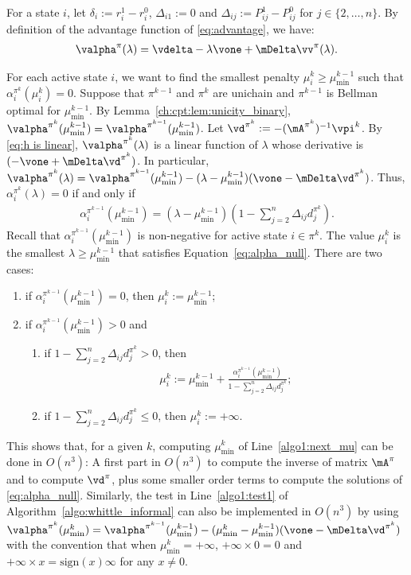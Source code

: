For a state $i$, let $\delta_i:=r^1_i - r^0_i$, $\Delta_{i1}:=0$ and $\Delta_{ij}:=P^1_{ij}-P^0_{ij}$ for $j\in\{2,\dots, n\}$. By definition of the advantage function of \eqref{eq:advantage}, we have: 
\begin{align*}
    \valpha^\pi(\lambda)=\vdelta -\lambda\vone +\mDelta\vv^\pi(\lambda).
\end{align*}

For each active state $i$, we want to find the smallest penalty $\mu^k_i\ge\mu^{k-1}_{\min}$ such that $\alpha^{\pi^k}_i(\mu^k_i)=0$.
Suppose that $\pi^{k-1}$ and $\pi^k$ are unichain and $\pi^{k-1}$ is Bellman optimal for $\mu^{k-1}_{\min}$.
By Lemma~\ref{ch:cpt:lem:unicity_binary}, $\valpha^{\pi^k}(\mu^{k-1}_{\min})= \valpha^{\pi^{k-1}}(\mu^{k-1}_{\min})$.
Let $\vd^{\pi^k}:=-(\mA^{\pi^k})^{-1}{\vpi^k}$.
By \eqref{eq:h is linear}, $\valpha^{\pi^k}(\lambda)$ is a linear function of $\lambda$ whose derivative is $(-\vone+\mDelta\vd^{\pi^k})$.
In particular, $\valpha^{\pi^k}(\lambda)=\valpha^{\pi^{k-1}}(\mu^{k-1}_{\min}) -(\lambda-\mu^{k-1}_{\min})(\vone -\mDelta\vd^{\pi^k})$.
Thus, $\alpha^{\pi^k}_i(\lambda)=0$ if and only if
\begin{align}
    \label{eq:alpha_null}
    \alpha^{\pi^{k-1}}_i(\mu^{k-1}_{\min}) = (\lambda -\mu^{k-1}_{\min})(1 -\sum_{j=2}^n\Delta_{ij} d_j^{\pi^k}).
\end{align}
Recall that $\alpha^{\pi^{k-1}}_i(\mu^{k-1}_{\min})$ is non-negative for active state $i\in\pi^k$. The value $\mu^k_i$ is the smallest $\lambda\ge\mu^{k-1}_{\min}$ that satisfies Equation~\eqref{eq:alpha_null}. There are two cases: 
\begin{enumerate}
    \item if $\alpha^{\pi^{k-1}}_i(\mu^{k-1}_{\min})=0$, then $\mu^k_i:=\mu^{k-1}_{\min}$;
    \item if $\alpha^{\pi^{k-1}}_i(\mu^{k-1}_{\min})>0$ and
        \begin{enumerate}
            \item if $1 -\sum_{j=2}^n\Delta_{ij} d_j^{\pi^k}>0$, then
            \begin{align}
                \label{eq:mu_i_k_from_d}
                \mu^k_i:=\mu^{k-1}_{\min} +\frac{ \alpha^{\pi^{k-1}}_i(\mu^{k-1}_{\min})}{1 -\sum_{j=2}^n\Delta_{ij} d_j^{\pi^k}};
            \end{align}
            \item if $1 -\sum_{j=2}^n\Delta_{ij} d_j^{\pi^k}\le0$, then $\mu^k_i:=+\infty$.
        \end{enumerate}
\end{enumerate}
This shows that, for a given $k$, computing $\mu^k_{\min}$ of Line~\ref{algo1:next_mu} can be done in $O(n^3)$: A first part in  $O(n^3)$ to compute the inverse of matrix $\mA^{\pi}$ and to compute $\vd^\pi$, plus some smaller order terms to compute the solutions of \eqref{eq:alpha_null}.
Similarly, the test in Line~\ref{algo1:test1} of Algorithm~\ref{algo:whittle_informal} can also be implemented in $O(n^3)$ by using $\valpha^{\pi^k}(\mu^k_{\min}) =\valpha^{\pi^{k-1}}(\mu^{k-1}_{\min}) -(\mu^k_{\min} -\mu^{k-1}_{\min})(\vone -\mDelta\vd^{\pi^k})$ with the convention that when $\mu^k_{\min} = +\infty$, $+\infty\times0=0$ and $+\infty\times x=\mathrm{sign}(x)\infty$ for any $x\ne0$. 

